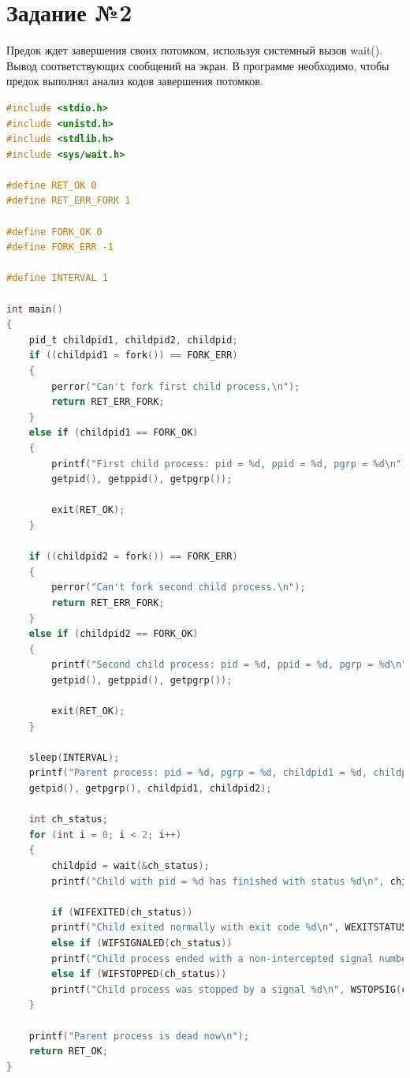 \documentclass[12pt]{report}
\begin{document}
\section*{Задание №2}

Предок ждет завершения своих потомком, используя системный вызов wait(). Вывод соответствующих сообщений на экран. В программе необходимо, чтобы предок выполнял анализ кодов завершения потомков.

\begin{lstlisting}[label=some-code,caption=Код программы к заданию №2,language=C]
#include <stdio.h>
#include <unistd.h>
#include <stdlib.h>
#include <sys/wait.h>

#define RET_OK 0
#define RET_ERR_FORK 1

#define FORK_OK 0
#define FORK_ERR -1

#define INTERVAL 1

int main()
{
	pid_t childpid1, childpid2, childpid;
	if ((childpid1 = fork()) == FORK_ERR)
	{
		perror("Can't fork first child process.\n");
		return RET_ERR_FORK;
	}
	else if (childpid1 == FORK_OK)
	{
		printf("First child process: pid = %d, ppid = %d, pgrp = %d\n", 
		getpid(), getppid(), getpgrp());
		
		exit(RET_OK);
	}
	
	if ((childpid2 = fork()) == FORK_ERR)
	{
		perror("Can't fork second child process.\n");
		return RET_ERR_FORK;
	}
	else if (childpid2 == FORK_OK)
	{
		printf("Second child process: pid = %d, ppid = %d, pgrp = %d\n", 
		getpid(), getppid(), getpgrp());
		
		exit(RET_OK);
	}
	
	sleep(INTERVAL);
	printf("Parent process: pid = %d, pgrp = %d, childpid1 = %d, childpid2 = %d\n", 
	getpid(), getpgrp(), childpid1, childpid2);
	
	int ch_status;
	for (int i = 0; i < 2; i++)
	{
		childpid = wait(&ch_status);
		printf("Child with pid = %d has finished with status %d\n", childpid, ch_status);
		
		if (WIFEXITED(ch_status))
		printf("Child exited normally with exit code %d\n", WEXITSTATUS(ch_status));
		else if (WIFSIGNALED(ch_status))
		printf("Child process ended with a non-intercepted signal number %d\n", WTERMSIG(ch_status));
		else if (WIFSTOPPED(ch_status))
		printf("Child process was stopped by a signal %d\n", WSTOPSIG(ch_status));
	}
	
	printf("Parent process is dead now\n");
	return RET_OK;
}
\end{lstlisting}
\end{document}

